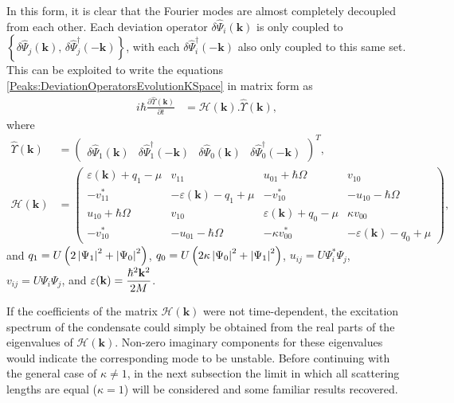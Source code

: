 In this form, it is clear that the Fourier modes are almost completely decoupled from each other. Each deviation operator $\delta\hat{\Psi}_i(\mathbf{k})$ is only coupled to $\left\{\delta\hat{\Psi}_j(\mathbf{k}),\, \delta\hat{\Psi}_j^\dagger(-\mathbf{k})\right\}$, with each $\delta\hat{\Psi}_i^\dagger(-\mathbf{k})$ also only coupled to this same set. This can be exploited to write the equations \eqref{Peaks:DeviationOperatorsEvolutionKSpace} in matrix form as
\begin{align}
    i \hbar \frac{\partial \hat{\Upsilon}(\mathbf{k})}{\partial t} &= \mathcal{H}(\mathbf{k}) . \hat{\Upsilon}(\mathbf{k}),
\end{align}
where
\begin{align}
    \hat{\Upsilon}(\mathbf{k}) &= 
    \begin{pmatrix}
        \delta\hat{\Psi}_1(\mathbf{k}) &
        \delta\hat{\Psi}_1^\dagger(-\mathbf{k}) &
        \delta\hat{\Psi}_0(\mathbf{k}) &
        \delta\hat{\Psi}_0^\dagger(-\mathbf{k})
    \end{pmatrix}^T,\\
    \mathcal{H}(\mathbf{k}) &=
    \begin{pmatrix}
        \varepsilon(\mathbf{k}) + q_{1} - \mu & v_{11} & u_{01} + \hbar \Omega & v_{10}\\
        -v_{11}^* & -\varepsilon(\mathbf{k}) - q_1 + \mu & -v_{10}^* & -u_{10} - \hbar \Omega\\
        u_{10} + \hbar \Omega & v_{10} & \varepsilon(\mathbf{k}) + q_0 - \mu & \kappa v_{00}\\
        -v_{10}^* & -u_{01} - \hbar \Omega & -\kappa v_{00}^* & -\varepsilon(\mathbf{k}) - q_0 + \mu
    \end{pmatrix},\label{Peaks:HMatrix}
\end{align}
and $q_1 = U\left(2\left|\Psi_1\right|^2+\left|\Psi_0\right|^2\right)$, $q_0 = U\left(2\kappa \left|\Psi_0\right|^2 + \left|\Psi_1\right|^2\right)$, $u_{ij} = U\Psi_i^*\Psi_j$, $v_{ij} = U\Psi_i\Psi_j$, and $\displaystyle \protect{\varepsilon(\mathbf{k}) = \frac{\hbar^2 \mathbf{k}^2}{2M}}$.

If the coefficients of the matrix $\mathcal{H}(\mathbf{k})$ were not time-dependent, the excitation spectrum of the condensate could simply be obtained from the real parts of the eigenvalues of $\mathcal{H}(\mathbf{k})$. Non-zero imaginary components for these eigenvalues would indicate the corresponding mode to be unstable. Before continuing with the general case of $\kappa \neq 1$, in the next subsection the limit in which all scattering lengths are equal ($\kappa=1$) will be considered and some familiar results recovered.


